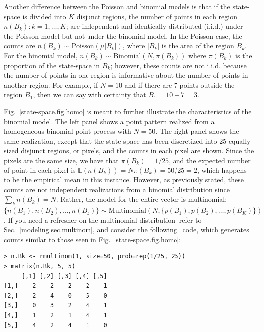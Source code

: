 Another difference between the Poisson and binomial models is that if the
state-space is divided into $K$ disjunct regions, the number of points in each
region $n(B_k): k=1,\dots,K$; are independent and identically
distributed (i.i.d.) under the Poisson model but not under the
binomial model. In the Poisson case,
the counts are %
$n(B_k) \sim
\text{Poisson}(\mu|B_k|)$, where $|B_k|$ is the area of the region
$B_k$. For the binomial model, $n(B_k) \sim
\text{Binomial}(N, \pi(B_k))$ where $\pi(B_k)$ is the proportion of
the state-space in $B_k$; however, these counts are not
i.i.d. because the number of points in one region is informative
about the number of points in another region. For example, if
$N=10$ %
and if %
there are 7 points outside the region $B_1$,
then we can say with certainty that $B_1 = 10 - 7 = 3$.

Fig.~\ref{state-space.fig.homo} is meant to further illustrate the characteristics
of the binomial model. The left panel shows a point pattern
realized from a
homogeneous binomial point process with $N=50$. The right panel shows
the same realization, except that the state-space has been discretized
into 25 equally-sized disjunct regions, or pixels, and the counts in each pixel
are shown. Since the pixels are the same
size, we have that $\pi(B_k) = 1/25$, and the expected number of point in each
pixel is $\mathbb{E}(n(B_k)) = N\pi(B_k) = 50/25 = 2$, which
happens to be the empirical mean in this instance. However, as
previously stated, these counts are not
independent realizations from a binomial distribution since $\sum_k
n(B_k) = N$. Rather, the model for the entire vector is multinomial:
$\{n(B_1), n(B_2), \dots, n(B_k)\} \sim \mbox{Multinomial}(N, \{p(B_1), p(B_2), \dots,
p(B_K) \})$ \citep{illian_etal:2008}. If you need a refresher on the
multinomial distribution, refer to Sec.~\ref{modeling.sec.multinom}, and
consider the following \R~code, which generates counts similar to those
seen in Fig.~\ref{state-space.fig.homo}:
\begin{verbatim}
> n.Bk <- rmultinom(1, size=50, prob=rep(1/25, 25))
> matrix(n.Bk, 5, 5)
     [,1] [,2] [,3] [,4] [,5]
[1,]    2    2    2    2    1
[2,]    2    4    0    5    0
[3,]    0    3    2    4    1
[4,]    1    2    1    4    1
[5,]    4    2    4    1    0
\end{verbatim}

